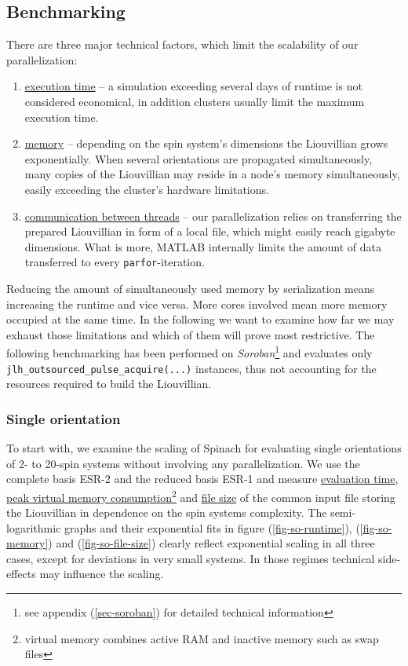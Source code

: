 \documentclass[11.5pt,a4paper]{article}
\begin{document}
\subsection{Benchmarking}
There are three  major technical factors, which limit the scalability of our parallelization:
\begin{enumerate}
 \item \underline{execution time} -- a simulation exceeding several days of runtime is not considered economical, in addition clusters usually limit the maximum execution time.
 \item \underline{memory} -- depending on the spin system's dimensions the Liouvillian grows exponentially. When several orientations are propagated simultaneously, many copies of the Liouvillian may reside in a node's memory simultaneously, easily exceeding the cluster's hardware limitations.
  \item \underline{communication between threads} -- our parallelization relies on transferring the prepared Liouvillian in form of a local file, which might easily reach gigabyte dimensions. What is more, MATLAB internally limits the amount of data transferred to every \verb$parfor$-iteration. 
\end{enumerate}
Reducing the amount of simultaneously used memory by serialization means increasing the runtime and vice versa. More cores involved mean more memory occupied at the same time. In the following we want to examine how far we may exhaust those limitations and which of them will prove most restrictive. The following benchmarking has been performed on \emph{Soroban}\footnote{see appendix (\ref{sec-soroban}) for detailed technical information} and evaluates only \verb$jlh_outsourced_pulse_acquire(...)$ instances, thus not accounting for the resources required to build the Liouvillian.
 
\subsubsection{Single orientation}
To start with, we examine the scaling of Spinach for evaluating single orientations of 2- to 20-spin systems without involving any parallelization. We use the complete basis ESR-2 and the reduced basis ESR-1 and measure \underline{evaluation time}, \underline{peak virtual memory consumption}\footnote{virtual memory combines active RAM and inactive memory such as swap files} and \underline{file size} of the common input file storing the Liouvillian in dependence on the spin systems complexity. The semi-logarithmic graphs and their exponential fits in figure (\ref{fig-so-runtime}), (\ref{fig-so-memory}) and (\ref{fig-so-file-size}) clearly reflect exponential scaling in all three cases, except for deviations in very small systems. In those regimes technical side-effects may influence the scaling.
\end{document}
